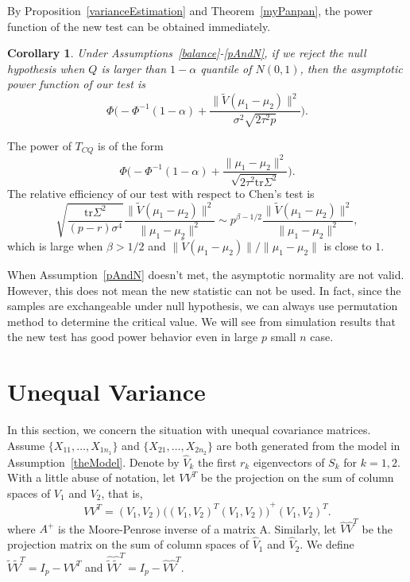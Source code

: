 \documentclass[review]{elsarticle}
\theoremstyle{plain}
\newtheorem{corollary}{\quad\quad Corollary}
\theoremstyle{definition}
\theoremstyle{remark}
\begin{document}
By Proposition~\ref{varianceEstimation}  and Theorem~\ref{myPanpan}, the power function of the new test can be obtained immediately.


\begin{corollary}\label{testPowerh}
    Under Assumptions~\ref{balance}-\ref{pAndN},
    if we reject the null hypothesis when $Q$ is larger than $1-\alpha$ quantile of $N(0,1)$, then the asymptotic power function of our test is
    \begin{equation*}
        \Phi\Big(-\Phi^{-1}(1-\alpha)+\frac{\|\tilde{V}(\mu_1-\mu_2)\|^2}{\sigma^2\sqrt{2\tau^2p}}\Big).
    \end{equation*}
\end{corollary}


 The power of $T_{CQ}$ is of the form
\begin{equation*}
    \Phi\Big(-\Phi^{-1}(1-\alpha)+\frac{\|\mu_1-\mu_2\|^2}{\sqrt{2\tau^2\mathrm{tr}\Sigma^2}}\Big).
\end{equation*}
 The relative efficiency of our test with respect to Chen's test is
\begin{equation*}
    \sqrt{\frac{\mathrm{tr}\Sigma^2}{(p-r)\sigma^4}}\frac{\|\tilde{V}(\mu_1-\mu_2)\|^2}{\|\mu_1-\mu_2\|^2}\sim p^{\beta-1/2}\frac{\|\tilde{V}(\mu_1-\mu_2)\|^2}{\|\mu_1-\mu_2\|^2},
\end{equation*}
which is large when $\beta>1/2$ and $\|\tilde{V}(\mu_1-\mu_2)\|/\|\mu_1-\mu_2\|$ is close to $1$.

When Assumption~\ref{pAndN} doesn't met, the asymptotic normality are not valid.
However, this does not mean the new statistic can not be used.
In fact, since the samples are exchangeable under null hypothesis, we can always use permutation method to determine the critical value.
We will see from simulation results that the new test has good power behavior even in large $p$ small $n$ case.


\section{Unequal Variance}

In this section, we concern the situation with unequal covariance matrices.
Assume $\{X_{11},\ldots, X_{1n_1}\}$ and $\{X_{21},\ldots, X_{2n_2}\}$ are both generated from the model in Assumption~\ref{theModel}.
Denote by $\hat{V}_k$ the first $r_k$ eigenvectors of $S_k$ for $k=1,2$.
With a little abuse of notation, let $VV^T$ be the projection on the sum of column spaces of $V_1$ and $V_2$, that is,
\begin{equation*}
    VV^T =(V_1,V_2){\big({(V_1,V_2)}^T (V_1,V_2)\big)}^{+}{(V_1,V_2)}^T.
\end{equation*}
where $A^{+}$ is the Moore-Penrose inverse of a matrix A. Similarly, let $\hat{V}\hat{V}^T$ be the projection matrix on the sum of column spaces of $\hat{V}_1$ and $\hat{V}_2$.
 We define $\tilde{V}\tilde{V}^T=I_{p}-VV^T$ and $\hat{\tilde{V}}\hat{\tilde{V}}^T=I_{p}-\hat{V}\hat{V}^T$. 
\end{document}
